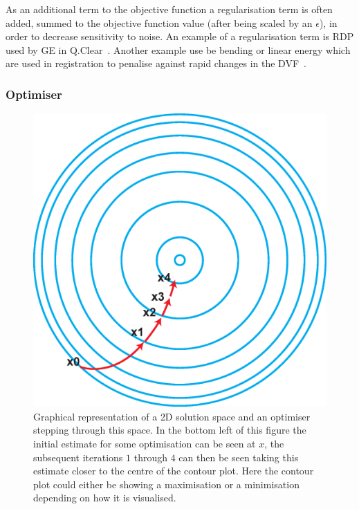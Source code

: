                 As an additional term to the objective function a regularisation term is often added, summed to the objective function value (after being scaled by an $\epsilon$), in order to decrease sensitivity to noise. An example of a regularisation term is \gls{RDP} used by \gls{GE} in Q.Clear~\parencite{qclear}. Another example use be bending or linear energy which are used in registration to penalise against rapid changes in the \gls{DVF}~\parencite{Modersitzki2009Fair:FlexibleRegistration}.
                
            \subsubsection{Optimiser} \label{sec:optimiser}
                \begin{figure}
                    \centering
                        
                    \includegraphics[width=1.0\linewidth]{figures/background_optimisation.png}
                        
                    \captionsetup{singlelinecheck=false, justification=raggedright}
                    \caption{Graphical representation of a \gls{2D} solution space and an optimiser stepping through this space. In the bottom left of this figure the initial estimate for some optimisation can be seen at $x$, the subsequent iterations $1$ through $4$ can then be seen taking this estimate closer to the centre of the contour plot. Here the contour plot could either be showing a maximisation or a minimisation depending on how it is visualised.} \label{fig:optimiser_optimisation}
                \end{figure}
                
